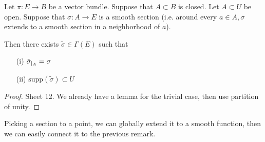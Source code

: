 \begin{lemma}\label{lem:8.6}
    Let \(\pi:E\to B\) be a vector bundle. Suppose that \(A\subset B\) is closed. Let \(A\subset U\) be open.
    Suppose that \(\sigma:A\to E\) is a smooth section (i.e. around every \(a\in A,\sigma\) extends to a smooth section in a neighborhood of \(a\)).
    
    Then there exists \(\tilde{\sigma}\in \Gamma(E)\) such that 
    \begin{enumerate}
        \item[(i)] \(\tilde{\sigma}_{|_{A}}=\sigma\)
        \item[(ii)] \(\text{supp}(\tilde{\sigma})\subset U\)  
    \end{enumerate}
\end{lemma}

\begin{proof}
    Sheet 12. We already have a lemma for the trivial case, then use partition of unity.
\end{proof}

Picking a section to a point, we can globally extend it to a smooth function, then we can easily connect it 
to the previous remark.


